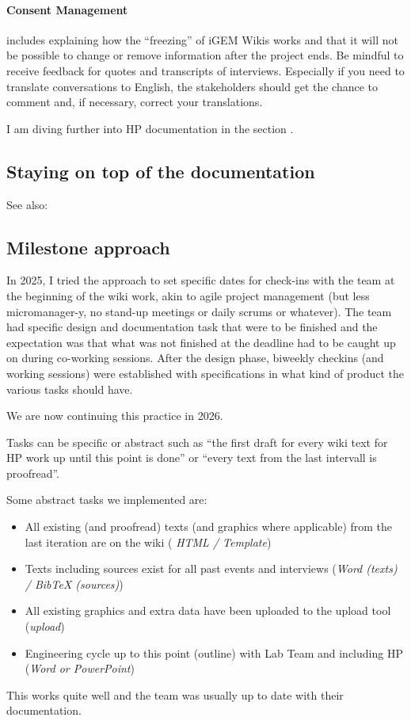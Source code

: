 \paragraph{Consent Management} includes explaining how the ``freezing'' of iGEM Wikis works and that it will not be possible to change or remove information after the project ends.
Be mindful to receive feedback for quotes and transcripts of interviews. 
Especially if you need to translate conversations to English, the stakeholders should get the chance to comment and, if necessary, correct your translations.

I am diving further into HP documentation in the section .

\subsection{Staying on top of the documentation}\label{subsec:staying-on-top-of-the-documentation}
See also: 
\subsection{Milestone approach}\label{subsec:milestone-approach}
In 2025, I tried the approach to set specific dates for check-ins with the team at the beginning of the wiki work,
akin to agile project management (but less micromanager-y, no stand-up meetings or daily scrums or whatever).
The team had specific design and documentation task that were to be finished and the expectation was that what was
not finished at the deadline had to be caught up on during co-working sessions.
After the design phase, biweekly checkins (and working sessions) were established with specifications in what kind
of product the various tasks should have.

We are now continuing this practice in 2026.

Tasks can be specific or abstract such as ``the first draft for every wiki text for HP work up
until this point is done'' or ``every text from the last intervall is proofread''.

Some abstract tasks we implemented are:
\begin{itemize}
    \item All existing (and proofread) texts (and graphics where applicable) from the last iteration are on the wiki (
    \textit{HTML / Template})
    \item Texts including sources exist for all past events and interviews (\textit{Word (texts) / BibTeX (sources)})
    \item All existing graphics and extra data have been uploaded to the upload tool (\textit{upload})
    \item Engineering cycle up to this point (outline) with Lab Team and including HP (\textit{Word or PowerPoint})
\end{itemize}
This works quite well and the team was usually up to date with their documentation.






